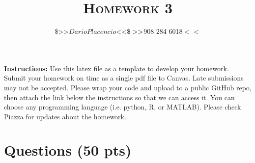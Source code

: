 \documentclass[a4paper]{article}
\title{\textsc{Homework 3}} %
\author{
\$>>$Dario Placencio$<<$ \\
\$>>$908 284 6018$<<$\\
}
\date{}
\theoremstyle{definition}
\begin{document}
\maketitle 


\textbf{Instructions:} 
Use this latex file as a template to develop your homework. Submit your homework on time as a single pdf file to Canvas. Late submissions may not be accepted. Please wrap your code and upload to a public GitHub repo, then attach the link below the instructions so that we can access it. You can choose any programming language (i.e. python, R, or MATLAB). Please check Piazza for updates about the homework.

\section{Questions (50 pts)}
\end{document}
